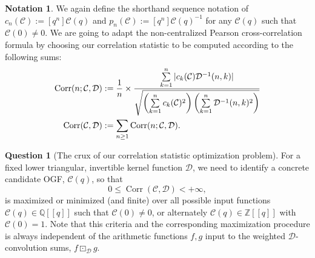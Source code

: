 \documentclass[12pt,reqno,a4letter]{article}
\numberwithin{figure}{section}
\numberwithin{table}{section}
\numberwithin{equation}{section}
\theoremstyle{plain}
\numberwithin{theorem}{section}
\theoremstyle{definition}
\newtheorem{notation}[theorem]{Notation}
\newtheorem{question}[theorem]{Question}
\begin{document}
\begin{notation}
We again define the shorthand sequence notation of 
$c_n(\mathcal{C}) := [q^n] \mathcal{C}(q)$ and 
$p_n(\mathcal{C}) := [q^n] \mathcal{C}(q)^{-1}$ for 
any $\mathcal{C}(q)$ such that $\mathcal{C}(0) \neq 0$. 
We are going to adapt the non-centralized Pearson cross-correlation formula 
by choosing our correlation statistic to be computed according to the following sums:
\begin{align}
\label{eqn_CrossCorrelationStatFormula_for_fixed_CDFuncs} 
\operatorname{Corr}(n; \mathcal{C}, \mathcal{D}) & := 
     \frac{1}{n} \times \frac{\sum\limits_{k=1}^{n} |c_k(\mathcal{C}) \mathcal{D}^{-1}(n, k)|}{ 
     \sqrt{\left(\sum\limits_{k=1}^{n} c_k(\mathcal{C})^2\right) \left( 
     \sum\limits_{k=1}^{n} \mathcal{D}^{-1}(n, k)^2\right)}} \\ 
\notag 
\operatorname{Corr}(\mathcal{C}, \mathcal{D}) & := 
     \sum_{n \geq 1} \operatorname{Corr}(n; \mathcal{C}, \mathcal{D}). 
\end{align}
\end{notation}

\begin{question}[The crux of our correlation statistic optimization problem]
For a fixed lower triangular, invertible kernel function $\mathcal{D}$, 
we need to identify a concrete candidate OGF, $\mathcal{C}(q)$, so that 
\[
0 \leq \operatorname{Corr}(\mathcal{C}, \mathcal{D}) < +\infty,
\]
is maximized or minimized (and finite) over all possible input functions 
$\mathcal{C}(q) \in \mathbb{Q}[[q]]$ such that $\mathcal{C}(0) \neq 0$, or alternately 
$\mathcal{C}(q) \in \mathbb{Z}[[q]]$ with $\mathcal{C}(0) = 1$. 
Note that this criteria and the corresponding maximization procedure 
is always independent of the arithmetic functions $f,g$ input to the 
weighted $\mathcal{D}$-convolution sums, $f \boxdot_{\mathcal{D}} g$. 
\end{question}
\end{document}
